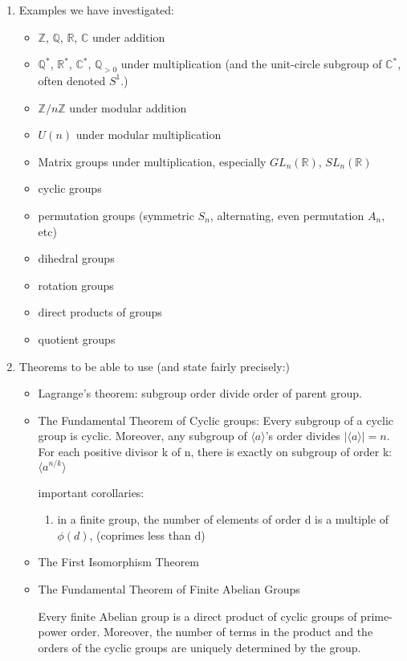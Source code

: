 \documentclass[11pt, oneside]{article}
\newcommand{\Z}{\mathbb Z}
\newcommand{\Q}{\mathbb Q}
\newcommand{\C}{\mathbb C}
\newcommand{\R}{\mathbb R}
\begin{document}
\begin{enumerate}
\newpage
\item Examples we have investigated:
\begin{itemize}
\item $\Z$, $\Q$, $\R$, $\C$ under addition
\item $\Q^*$, $\R^*$, $\C^*$, $\Q_{>0}$ under multiplication (and the unit-circle subgroup of $\C^*$, often denoted $S^1$.)
\item $\Z/n\Z$ under modular addition
\item $U(n)$ under modular multiplication
\item Matrix groups under multiplication, especially $GL_n(\R)$, $SL_n(\R)$
\item cyclic groups
\item permutation groups (symmetric $S_n$, alternating, even permutation $A_n$, etc)
\item dihedral groups
\item rotation groups
\item direct products of groups
\item quotient groups
\end{itemize}



\newpage

\item Theorems to be able to use (and state fairly precisely:)
\begin{itemize}
\item Lagrange's theorem: subgroup order divide order of parent group. 
\item The Fundamental Theorem of Cyclic groups: Every subgroup of a cyclic group is cyclic. Moreover, any subgroup of $\langle a \rangle$'s order divides $|\langle a \rangle|=n$. For each positive divisor k of n, there is exactly on subgroup of order k: $\langle a^{n/k} \rangle$

important corollaries: \begin{enumerate}
    \item in a finite group, the number of elements of order d is a multiple of $\phi(d)$, (coprimes less than d)
\end{enumerate}
\item The First Isomorphism Theorem
\item The Fundamental Theorem of Finite Abelian Groups

Every finite Abelian group is a direct product of cyclic groups of prime-power order. Moreover, the number of terms in the product and the orders of the cyclic groups are uniquely determined by the group.


\end{itemize}
\end{enumerate}
\end{document}
